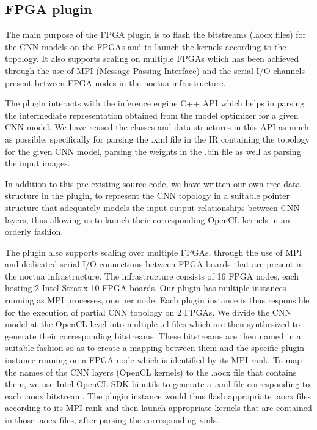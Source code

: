  \subsection{FPGA plugin}
 The main purpose of the FPGA plugin is to flash the bitstreams (.aocx files) for the CNN models on the FPGAs and to launch the kernels according to the topology. It also supports scaling on multiple FPGAs which has been achieved through the use of MPI (Message Passing Interface) and the serial I/O channels present between FPGA nodes in the noctua infrastructure. 
 
 The plugin interacts with the inference engine C++ API which helps in parsing the intermediate representation obtained from the model optimizer for a given CNN model. We have reused the classes and data structures in this API as much as possible, specifically for parsing the .xml file in the IR containing the topology for the given CNN model, parsing the weights in the .bin file as well as parsing the input images.
 
 In addition to this pre-existing source code, we have written our own tree data structure in the plugin, to represent the CNN topology in a suitable pointer structure that adequately models the input output relationships between CNN layers, thus allowing us to launch their corresponding OpenCL kernels in an orderly fashion. 
 
 The plugin also supports scaling over multiple FPGAs, through the use of MPI and dedicated serial I/O connections between FPGA boards that are present in the noctua infrastructure. The infrastructure consists of 16 FPGA nodes, each hosting 2 Intel Stratix 10 FPGA boards. Our plugin has multiple instances running as MPI processes, one per node. Each plugin instance is thus responsible for the execution of partial CNN topology on 2 FPGAs. We divide the CNN model at the OpenCL level into multiple .cl files which are then synthesized to generate their corresponding bitstreams. These bitstreams are then named in a suitable fashion so as to create a mapping between them and the specific plugin instance running on a FPGA node which is identified by its MPI rank. To map the names of the CNN layers (OpenCL kernels) to the .aocx file that contains them, we use Intel OpenCL SDK binutils to generate a .xml file corresponding to each .aocx bitstream. The plugin instance would thus flash appropriate .aocx files according to its MPI rank and then launch appropriate kernels that are contained in those .aocx files, after parsing the corresponding xmls. 
 

